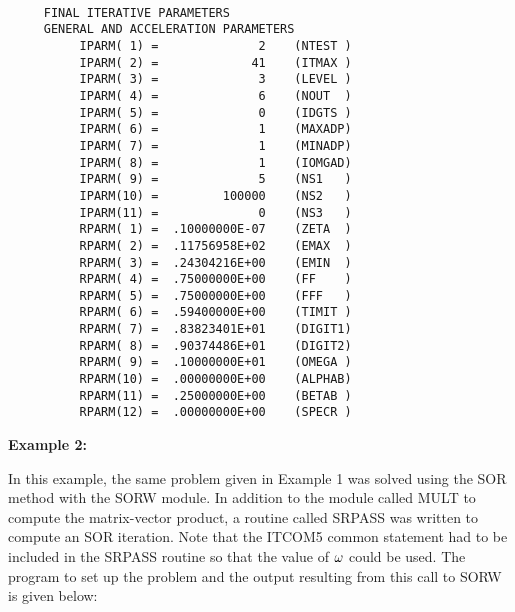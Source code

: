 \newpage
\begin{verbatim}
 
     FINAL ITERATIVE PARAMETERS
     GENERAL AND ACCELERATION PARAMETERS
          IPARM( 1) =              2    (NTEST )
          IPARM( 2) =             41    (ITMAX )
          IPARM( 3) =              3    (LEVEL )
          IPARM( 4) =              6    (NOUT  )
          IPARM( 5) =              0    (IDGTS )
          IPARM( 6) =              1    (MAXADP)
          IPARM( 7) =              1    (MINADP)
          IPARM( 8) =              1    (IOMGAD)
          IPARM( 9) =              5    (NS1   )
          IPARM(10) =         100000    (NS2   )
          IPARM(11) =              0    (NS3   )
          RPARM( 1) =  .10000000E-07    (ZETA  )
          RPARM( 2) =  .11756958E+02    (EMAX  )
          RPARM( 3) =  .24304216E+00    (EMIN  )
          RPARM( 4) =  .75000000E+00    (FF    )
          RPARM( 5) =  .75000000E+00    (FFF   )
          RPARM( 6) =  .59400000E+00    (TIMIT )
          RPARM( 7) =  .83823401E+01    (DIGIT1)
          RPARM( 8) =  .90374486E+01    (DIGIT2)
          RPARM( 9) =  .10000000E+01    (OMEGA )
          RPARM(10) =  .00000000E+00    (ALPHAB)
          RPARM(11) =  .25000000E+00    (BETAB )
          RPARM(12) =  .00000000E+00    (SPECR )
\end{verbatim}

\newpage
\noindent
{\bf Example 2:}
\bigskip
\indent

In this example, the same problem given in Example 1 was solved 
using the SOR method with the SORW module.  In addition to the
module called MULT to compute the matrix-vector product, a routine
called SRPASS was written to compute an SOR iteration. Note that
the ITCOM5 common statement had to be included in the SRPASS routine
so that the value of $\omega$ could be used.  The program to set up 
the problem and the output resulting from this call to SORW is given 
below:

